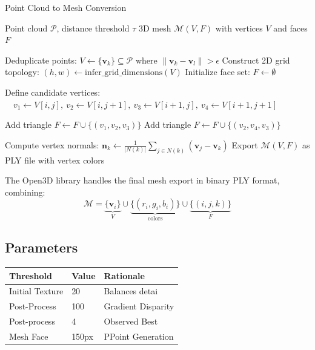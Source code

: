 \documentclass[12pt]{article}
\begin{document}
\begin{multicols}{2}
\begin{algorithm}[H]
\caption{Point Cloud to Mesh Conversion}
\begin{algorithmic}[1]
\Require{} Point cloud $\mathcal{P}$, distance threshold $\tau$
\Ensure{} 3D mesh $\mathcal{M}(V,F)$ with vertices $V$ and faces $F$

\State{} Deduplicate points: $V \gets \{\mathbf{v}_k\} \subseteq \mathcal{P}$ where $\|\mathbf{v}_k - \mathbf{v}_l\| > \epsilon$
\State{} Construct 2D grid topology: $(h,w) \gets \text{infer\_grid\_dimensions}(V)$
\State{} Initialize face set: $F \gets \emptyset$

    \State{} Define candidate vertices:
    \State{} $\quad v_1 \gets V[i,j],\ v_2 \gets V[i,j+1],\ v_3 \gets V[i+1,j],\ v_4 \gets V[i+1,j+1]$
    
        \State{} Add triangle $F \gets F \cup \{(v_1,v_2,v_3)\}$
        \State{} Add triangle $F \gets F \cup \{(v_2,v_4,v_3)\}$
    \EndIf{}
\EndFor{}

\State{} Compute vertex normals: $\mathbf{n}_k \gets \frac{1}{|N(k)|}\sum_{j\in N(k)}(\mathbf{v}_j - \mathbf{v}_k)$
\State{} Export $\mathcal{M}(V,F)$ as PLY file with vertex colors
\end{algorithmic}
\end{algorithm}


The Open3D library handles the final mesh export in binary PLY format, combining:
\begin{equation}
    \mathcal{M} = \underbrace{\{\mathbf{v}_i\}}_{V} \cup \underbrace{\{(r_i,g_i,b_i)\}}_{\text{colors}} \cup \underbrace{\{(i,j,k)\}}_{F}
\end{equation}

\subsection{Parameters}

\begin{table}[h]
\centering
\begin{tabular}{|l|l|l|}
\hline
\textbf{Threshold} & \textbf{Value} & \textbf{Rationale} \\ \hline
Initial Texture & 20 & Balances detai \\ \hline
Post-Process & 100 & Gradient Disparity \\ \hline
Post-process & 4 & Observed Best \\ \hline
Mesh Face & 150px & PPoint Generation \\ \hline
\end{tabular}
\end{table}



\end{multicols}
\end{document}
